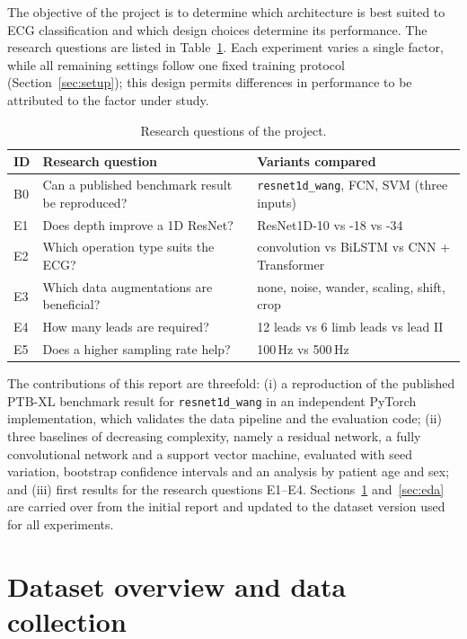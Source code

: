 \documentclass{article}
\newcommand{\wang}{\texttt{resnet1d\_wang}}
\begin{document}
The objective of the project is to determine which architecture is best suited to ECG classification and which design choices determine its performance. The research questions are listed in Table~\ref{tab:questions}. Each experiment varies a single factor, while all remaining settings follow one fixed training protocol (Section~\ref{sec:setup}); this design permits differences in performance to be attributed to the factor under study.

\begin{table}[h]
  \caption{Research questions of the project.}
  \label{tab:questions}
  \centering\small
  \setlength{\tabcolsep}{4pt}
  \begin{tabular}{lll}
    \toprule
    ID & Research question & Variants compared \\
    \midrule
    B0 & Can a published benchmark result be reproduced? & \wang{}, FCN, SVM (three inputs) \\
    E1 & Does depth improve a 1D ResNet? & ResNet1D-10 vs -18 vs -34 \\
    E2 & Which operation type suits the ECG? & convolution vs BiLSTM vs CNN + Transformer \\
    E3 & Which data augmentations are beneficial? & none, noise, wander, scaling, shift, crop \\
    E4 & How many leads are required? & 12 leads vs 6 limb leads vs lead II \\
    E5 & Does a higher sampling rate help? & 100\,Hz vs 500\,Hz \\
    \bottomrule
  \end{tabular}
\end{table}

The contributions of this report are threefold: (i) a reproduction of the published PTB-XL benchmark result for \wang{} in an independent PyTorch implementation, which validates the data pipeline and the evaluation code; (ii) three baselines of decreasing complexity, namely a residual network, a fully convolutional network and a support vector machine, evaluated with seed variation, bootstrap confidence intervals and an analysis by patient age and sex; and (iii) first results for the research questions E1--E4. Sections~\ref{sec:data} and~\ref{sec:eda} are carried over from the initial report and updated to the dataset version used for all experiments.

\section{Dataset overview and data collection}
\label{sec:data}
\end{document}
